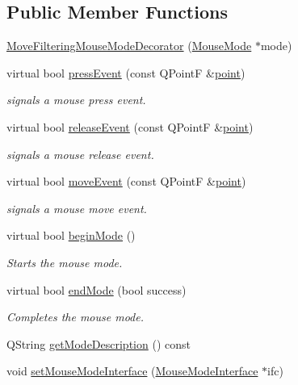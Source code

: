 \subsection*{Public Member Functions}
\begin{DoxyCompactItemize}
\item 
\mbox{\hyperlink{class_move_filtering_mouse_mode_decorator_a8b339146a2755779bf8c93e0ddf96d33}{Move\+Filtering\+Mouse\+Mode\+Decorator}} (\mbox{\hyperlink{class_mouse_mode}{Mouse\+Mode}} $\ast$mode)
\item 
virtual bool \mbox{\hyperlink{class_move_filtering_mouse_mode_decorator_a78748a2dffb39087c8a5a16859b73615}{press\+Event}} (const Q\+PointF \&\mbox{\hyperlink{diffusion_8cpp_a380468221cb8294f9329d11c99c4da30}{point}})
\begin{DoxyCompactList}\small\item\em signals a mouse press event. \end{DoxyCompactList}\item 
virtual bool \mbox{\hyperlink{class_move_filtering_mouse_mode_decorator_a331745d728889576d415a0e6f20aa236}{release\+Event}} (const Q\+PointF \&\mbox{\hyperlink{diffusion_8cpp_a380468221cb8294f9329d11c99c4da30}{point}})
\begin{DoxyCompactList}\small\item\em signals a mouse release event. \end{DoxyCompactList}\item 
virtual bool \mbox{\hyperlink{class_move_filtering_mouse_mode_decorator_a9755a8c9d311a388199be9402d8f5e71}{move\+Event}} (const Q\+PointF \&\mbox{\hyperlink{diffusion_8cpp_a380468221cb8294f9329d11c99c4da30}{point}})
\begin{DoxyCompactList}\small\item\em signals a mouse move event. \end{DoxyCompactList}\item 
virtual bool \mbox{\hyperlink{class_move_filtering_mouse_mode_decorator_af24ae14f9b096c26d94ff0e51b716c46}{begin\+Mode}} ()
\begin{DoxyCompactList}\small\item\em Starts the mouse mode. \end{DoxyCompactList}\item 
virtual bool \mbox{\hyperlink{class_move_filtering_mouse_mode_decorator_a3986dc8532f8e483444c875d5e050c3b}{end\+Mode}} (bool success)
\begin{DoxyCompactList}\small\item\em Completes the mouse mode. \end{DoxyCompactList}\item 
Q\+String \mbox{\hyperlink{class_move_filtering_mouse_mode_decorator_ae66c9e6988302358b19aa7c8259edbdd}{get\+Mode\+Description}} () const
\item 
void \mbox{\hyperlink{class_move_filtering_mouse_mode_decorator_ab275ef7f3f65b4f1c58c937e167c55d3}{set\+Mouse\+Mode\+Interface}} (\mbox{\hyperlink{class_mouse_mode_interface}{Mouse\+Mode\+Interface}} $\ast$ifc)
\end{DoxyCompactItemize}
